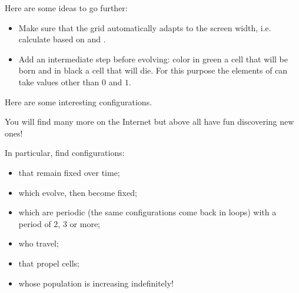 \documentclass[11pt,class=report,crop=false]{standalone}
\begin{document}
Here are some ideas to go further:
\begin{itemize}
  \item Make sure that the grid automatically adapts to the screen width, i.e. calculate  based on  and .
  
  \item Add an intermediate step before evolving: color in green a cell that will be born and in black a cell that will die. For this purpose the elements of  can take values other than $0$ and $1$.
\end{itemize}

Here are some interesting configurations. 

You will find many more on the Internet but above all have fun discovering new ones!

In particular, find configurations:
\begin{itemize}
  \item that remain fixed over time;
  \item which evolve, then become fixed;
  \item which are periodic (the same configurations come back in loops) with a period of $2$, $3$ or more;
  \item who travel;
  \item that propel cells; 
  \item whose population is increasing indefinitely!
\end{itemize}
\end{document}
